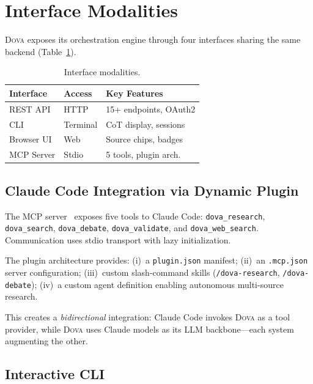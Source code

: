 \documentclass{article}
\theoremstyle{plain}
\theoremstyle{definition}
\newcommand{\dova}{\textsc{Dova}}
\begin{document}
\section{Interface Modalities}\label{sec:interfaces}

\dova{} exposes its orchestration engine through four interfaces sharing the
same backend (Table~\ref{tab:interfaces}).

\begin{table}[t]
\caption{Interface modalities.}
\label{tab:interfaces}
\centering
\small
\begin{tabular}{@{}lll@{}}
\toprule
\textbf{Interface} & \textbf{Access} & \textbf{Key Features} \\
\midrule
REST API   & HTTP      & 15+ endpoints, OAuth2 \\
CLI        & Terminal  & CoT display, sessions \\
Browser UI & Web       & Source chips, badges \\
MCP Server & Stdio     & 5 tools, plugin arch. \\
\bottomrule
\end{tabular}
\end{table}

\subsection{Claude Code Integration via Dynamic Plugin}\label{sec:claude_code}

The MCP server~\citep{anthropic2024mcp} exposes five tools to Claude Code:
\texttt{dova\_research}, \texttt{dova\_search}, \texttt{dova\_debate},
\texttt{dova\_validate}, and \texttt{dova\_web\_search}.  Communication uses
stdio transport with lazy initialization.

The plugin architecture provides:
(i)~a \texttt{plugin.json} manifest;
(ii)~an \texttt{.mcp.json} server configuration;
(iii)~custom slash-command skills (\texttt{/dova-research},
\texttt{/dova-debate});
(iv)~a custom agent definition enabling autonomous multi-source research.

This creates a \emph{bidirectional} integration: Claude Code invokes \dova{}
as a tool provider, while \dova{} uses Claude models as its LLM
backbone---each system augmenting the other.

\subsection{Interactive CLI}\label{sec:cli}
\end{document}
